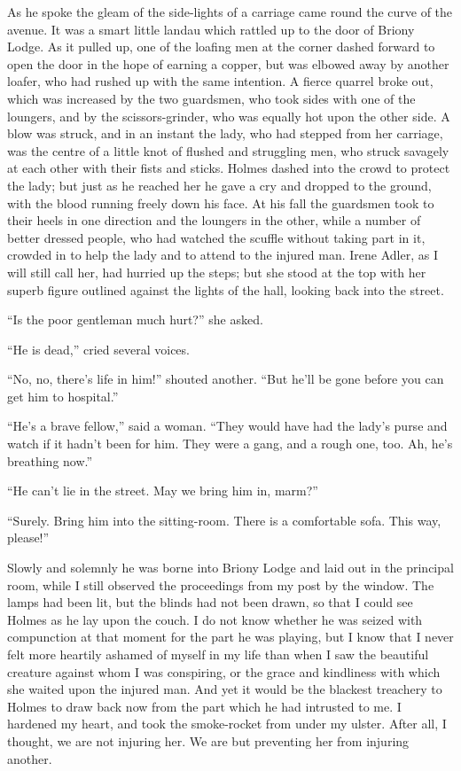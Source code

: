 As he spoke the gleam of the side-lights of a carriage came
round the curve of the avenue. It was a smart little landau
which rattled up to the door of Briony Lodge. As it pulled
up, one of the loafing men at the corner dashed forward to
open the door in the hope of earning a copper, but was elbowed
away by another loafer, who had rushed up with the
same intention. A fierce quarrel broke out, which was
increased by the two guardsmen, who took sides with one of the
loungers, and by the scissors-grinder, who was equally hot
upon the other side. A blow was struck, and in an instant
the lady, who had stepped from her carriage, was the centre
of a little knot of flushed and struggling men, who struck
savagely at each other with their fists and sticks. Holmes
dashed into the crowd to protect the lady; but just as he
reached her he gave a cry and dropped to the ground, with
the blood running freely down his face. At his fall the
guardsmen took to their heels in one direction and the loungers
in the other, while a number of better dressed people,
who had watched the scuffle without taking part in it, crowded
in to help the lady and to attend to the injured man. Irene
Adler, as I will still call her, had hurried up the steps; but
she stood at the top with her superb figure outlined against
the lights of the hall, looking back into the street.

“Is the poor gentleman much hurt?” she asked.

“He is dead,” cried several voices.

“No, no, there’s life in him!” shouted another. “But he’ll
be gone before you can get him to hospital.”

“He’s a brave fellow,” said a woman. “They would have
had the lady’s purse and watch if it hadn’t been for him.
They were a gang, and a rough one, too. Ah, he’s breathing
now.”

“He can’t lie in the street. May we bring him in, marm?”

“Surely. Bring him into the sitting-room. There is a
comfortable sofa. This way, please!”

Slowly and solemnly he was borne into Briony Lodge and
laid out in the principal room, while I still observed the
proceedings from my post by the window. The lamps had been
lit, but the blinds had not been drawn, so that I could see
Holmes as he lay upon the couch. I do not know whether
he was seized with compunction at that moment for the part
he was playing, but I know that I never felt more heartily
ashamed of myself in my life than when I saw the beautiful
creature against whom I was conspiring, or the grace and
kindliness with which she waited upon the injured man. And
yet it would be the blackest treachery to Holmes to draw
back now from the part which he had intrusted to me. I
hardened my heart, and took the smoke-rocket from under
my ulster. After all, I thought, we are not injuring her. We
are but preventing her from injuring another.

